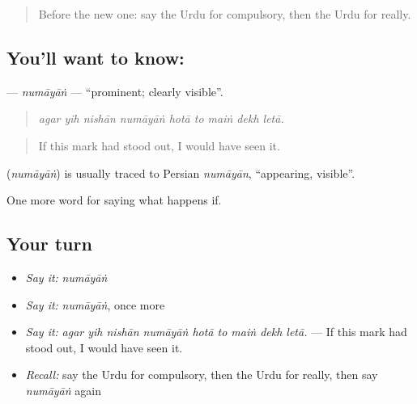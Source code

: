 \label{lesson:UR-C364-numayan}



\begin{quote}
Before the new one: say the Urdu for compulsory, then the Urdu for really.
\end{quote}

\subsection*{You'll want to know: }
\textbf{} — \emph{numāyāṅ} — \textquotedblleft{}prominent; clearly visible\textquotedblright{}.

\begin{quote}
        
\end{quote}

\begin{quote}
\emph{agar yih nishān numāyāṅ hotā to maiṅ dekh letā.}
\end{quote}

\begin{quote}
If this mark had stood out, I would have seen it.
\end{quote}

\begin{cousinweb}
\textbf{} (\emph{numāyāṅ}) is usually traced to Persian \emph{numāyān}, \textquotedblleft{}appearing, visible\textquotedblright{}.
\end{cousinweb}

\begin{grammarlens}[title={What you've built}]
One more word for saying what happens if.
\end{grammarlens}

\subsection*{Your turn}
\begin{itemize}
\raggedright
  \item \emph{Say it:} \emph{numāyāṅ}
  \item \emph{Say it:} \emph{numāyāṅ}, once more
  \item \emph{Say it:} \emph{agar yih nishān numāyāṅ hotā to maiṅ dekh letā.} — If this mark had stood out, I would have seen it.
  \item \emph{Recall:} say the Urdu for compulsory, then the Urdu for really, then say \emph{numāyāṅ} again
\end{itemize}


